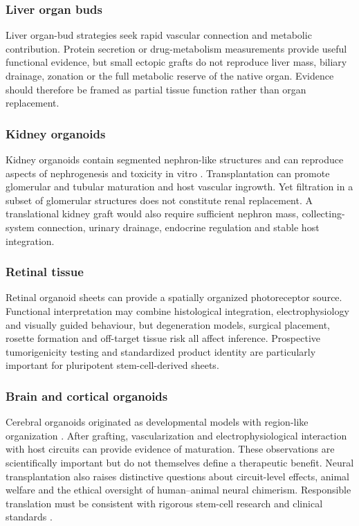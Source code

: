\documentclass[11pt,a4paper]{article}
\begin{document}
\subsubsection{Liver organ buds}

Liver organ-bud strategies seek rapid vascular connection and metabolic contribution. Protein secretion or drug-metabolism measurements provide useful functional evidence, but small ectopic grafts do not reproduce liver mass, biliary drainage, zonation or the full metabolic reserve of the native organ. Evidence should therefore be framed as partial tissue function rather than organ replacement.

\subsubsection{Kidney organoids}

Kidney organoids contain segmented nephron-like structures and can reproduce aspects of nephrogenesis and toxicity in vitro \citep{takasato2015,morizane2015}. Transplantation can promote glomerular and tubular maturation and host vascular ingrowth. Yet filtration in a subset of glomerular structures does not constitute renal replacement. A translational kidney graft would also require sufficient nephron mass, collecting-system connection, urinary drainage, endocrine regulation and stable host integration.

\subsubsection{Retinal tissue}

Retinal organoid sheets can provide a spatially organized photoreceptor source. Functional interpretation may combine histological integration, electrophysiology and visually guided behaviour, but degeneration models, surgical placement, rosette formation and off-target tissue risk all affect inference. Prospective tumorigenicity testing and standardized product identity are particularly important for pluripotent stem-cell-derived sheets.

\subsubsection{Brain and cortical organoids}

Cerebral organoids originated as developmental models with region-like organization \citep{lancaster2013}. After grafting, vascularization and electrophysiological interaction with host circuits can provide evidence of maturation. These observations are scientifically important but do not themselves define a therapeutic benefit. Neural transplantation also raises distinctive questions about circuit-level effects, animal welfare and the ethical oversight of human--animal neural chimerism. Responsible translation must be consistent with rigorous stem-cell research and clinical standards \citep{lovellbadge2021}.
\end{document}
